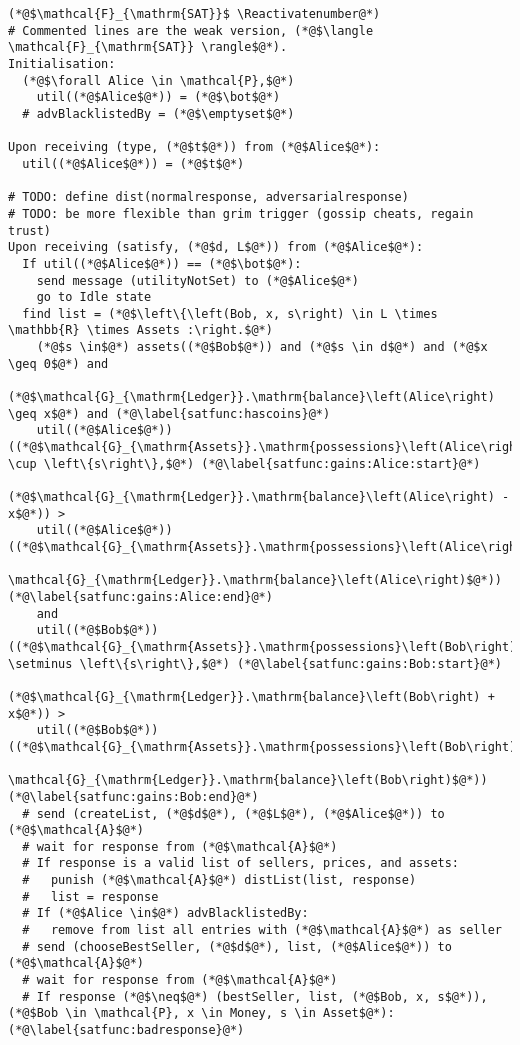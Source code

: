 \Suppressnumber
\begin{lstlisting}[label=satfunc, style=numbers]
(*@$\mathcal{F}_{\mathrm{SAT}}$ \Reactivatenumber@*)
# Commented lines are the weak version, (*@$\langle \mathcal{F}_{\mathrm{SAT}} \rangle$@*).
Initialisation:
  (*@$\forall Alice \in \mathcal{P},$@*)
    util((*@$Alice$@*)) = (*@$\bot$@*)
  # advBlacklistedBy = (*@$\emptyset$@*)

Upon receiving (type, (*@$t$@*)) from (*@$Alice$@*):
  util((*@$Alice$@*)) = (*@$t$@*)

# TODO: define dist(normalresponse, adversarialresponse)
# TODO: be more flexible than grim trigger (gossip cheats, regain trust)
Upon receiving (satisfy, (*@$d, L$@*)) from (*@$Alice$@*):
  If util((*@$Alice$@*)) == (*@$\bot$@*):
    send message (utilityNotSet) to (*@$Alice$@*)
    go to Idle state
  find list = (*@$\left\{\left(Bob, x, s\right) \in L \times \mathbb{R} \times Assets :\right.$@*)
    (*@$s \in$@*) assets((*@$Bob$@*)) and (*@$s \in d$@*) and (*@$x \geq 0$@*) and
    (*@$\mathcal{G}_{\mathrm{Ledger}}.\mathrm{balance}\left(Alice\right) \geq x$@*) and (*@\label{satfunc:hascoins}@*)
    util((*@$Alice$@*))((*@$\mathcal{G}_{\mathrm{Assets}}.\mathrm{possessions}\left(Alice\right) \cup \left\{s\right\},$@*) (*@\label{satfunc:gains:Alice:start}@*)
        (*@$\mathcal{G}_{\mathrm{Ledger}}.\mathrm{balance}\left(Alice\right) - x$@*)) >
    util((*@$Alice$@*))((*@$\mathcal{G}_{\mathrm{Assets}}.\mathrm{possessions}\left(Alice\right),
    \mathcal{G}_{\mathrm{Ledger}}.\mathrm{balance}\left(Alice\right)$@*)) (*@\label{satfunc:gains:Alice:end}@*)
    and
    util((*@$Bob$@*))((*@$\mathcal{G}_{\mathrm{Assets}}.\mathrm{possessions}\left(Bob\right) \setminus \left\{s\right\},$@*) (*@\label{satfunc:gains:Bob:start}@*)
        (*@$\mathcal{G}_{\mathrm{Ledger}}.\mathrm{balance}\left(Bob\right) + x$@*)) >
    util((*@$Bob$@*))((*@$\mathcal{G}_{\mathrm{Assets}}.\mathrm{possessions}\left(Bob\right),
    \mathcal{G}_{\mathrm{Ledger}}.\mathrm{balance}\left(Bob\right)$@*)) (*@\label{satfunc:gains:Bob:end}@*)
  # send (createList, (*@$d$@*), (*@$L$@*), (*@$Alice$@*)) to (*@$\mathcal{A}$@*)
  # wait for response from (*@$\mathcal{A}$@*)
  # If response is a valid list of sellers, prices, and assets:
  #   punish (*@$\mathcal{A}$@*) distList(list, response)
  #   list = response
  # If (*@$Alice \in$@*) advBlacklistedBy:
  #   remove from list all entries with (*@$\mathcal{A}$@*) as seller
  # send (chooseBestSeller, (*@$d$@*), list, (*@$Alice$@*)) to (*@$\mathcal{A}$@*)
  # wait for response from (*@$\mathcal{A}$@*)
  # If response (*@$\neq$@*) (bestSeller, list, (*@$Bob, x, s$@*)), (*@$Bob \in \mathcal{P}, x \in Money, s \in Asset$@*): (*@\label{satfunc:badresponse}@*)

\end{lstlisting}
